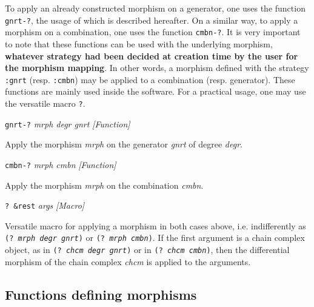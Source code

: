 To apply an already constructed morphism on a generator,
one uses the function  {\tt gnrt-?},
the usage of which is described hereafter. On a similar way, to apply a morphism on a combination,
one uses the function {\tt cmbn-?}.
It is very important to note that these functions
can be used with the underlying morphism, {\bf whatever strategy had been decided
at creation time by the user for the morphism mapping}. In other words, a morphism defined
with the strategy {\tt :gnrt} (resp. {\tt :cmbn}) may be applied to a combination (resp.  generator).
These functions are mainly used inside the software. For a practical usage, one may use the versatile macro
{\tt ?}.
\vskip 0.35cm
{\parindent=0mm
{\leftskip=5mm
{\tt gnrt-?} {\em mrph degr gnrt} \hfill {\em [Function]} \par}
{\leftskip=15mm
Apply the morphism {\em mrph} on the generator  {\em gnrt} of degree {\em degr}. \par}
{\leftskip=5mm
{\tt cmbn-?} {\em mrph cmbn} \hfill {\em [Function]} \par}
{\leftskip=15mm
Apply the morphism {\em mrph} on the combination  {\em cmbn}. \par}
{\leftskip=5mm
{\tt ? \&rest} {\em args} \hfill {\em [Macro]} \par}
{\leftskip=15mm
Versatile macro for applying a morphism  in both cases above, i.e. indifferently
as {\tt (? {\em mrph degr gnrt})} or  {\tt (? {\em mrph cmbn})}. If the first argument
is a chain complex object, as in  {\tt (? {\em chcm degr gnrt})} or in  {\tt (? {\em chcm cmbn})}, then
the differential morphism of the chain complex {\em chcm} is applied to the arguments. \par}
}

\newpage

\subsection {Functions defining morphisms}

